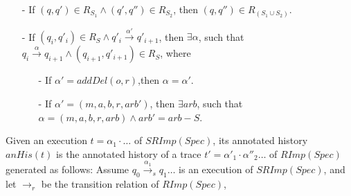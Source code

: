 \begin{itemize}
\setlength{\itemsep}{0.5pt}
\item[-] If $(q,q') \in R_{ S_1 } \wedge (q',q'') \in R_{ S_2 }$, then $(q,q'') \in R_{ ( S_1 \cup S_2 ) }$.

\item[-] If $(q_i,q'_i) \in R_{S} \wedge q'_i {\xrightarrow{\alpha'}} q'_{i+1}$, then $\exists \alpha$, such that $q_i {\xrightarrow{\alpha}} q_{i+1} \wedge (q_{i+1},q'_{i+1}) \in R_{S}$, where

    \begin{itemize}
    \setlength{\itemsep}{0.5pt}
    \item[-] If $\alpha' = addDel(o,r)$,then $\alpha = \alpha'$.

    \item[-] If $\alpha'=(m,a,b,r,\mathit{arb}')$, then $\exists \mathit{arb}$, such that $\alpha=(m,a,b,r,\mathit{arb}) \wedge \mathit{arb}' = \mathit{arb} - S$.
    \end{itemize}
\end{itemize}


Given an execution $t = \alpha_1 \cdot \ldots$ of $SRImp(Spec)$, its annotated history $anHis(t)$ is the annotated history of a trace $t' = \alpha'_1 \cdot \alpha''_2 \ldots$ of $RImp(Spec)$ generated as follows: Assume $q_0 {\xrightarrow{\alpha_1}}_s q_1 \ldots$ is an execution of $SRImp(Spec)$, and let $\rightarrow_r$ be the transition relation of $RImp(Spec)$,

